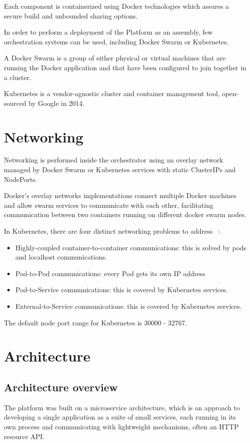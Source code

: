 Each component is containerized using Docker technologies which assures a secure build and unbounded sharing options.

In order to perform a deployment of the Platform as an assembly, few orchestration systems can be used, including Docker Swarm or Kubernetes.

A Docker Swarm is a group of either physical or virtual machines that are running the Docker application and that have been configured to join together in a cluster.

Kubernetes is a vendor-agnostic cluster and container management tool, open-sourced by Google in 2014.

\section{Networking}

Networking is performed inside the orchestrator using an overlay network managed by Docker Swarm or Kubernetes services with static ClusterIPs and NodePorts.

Docker's overlay networks implementations connect multiple Docker machines and allow swarm services to communicate with each other, facilitating communication between two containers running on
different docker swarm nodes.

In Kubernetes, there are four distinct networking problems to address ~\cite{authors2017kubernetes}:

\begin{itemize}
    \item Highly-coupled container-to-container communications: this is solved by pods and localhost communications.
    \item Pod-to-Pod communications: every Pod gets its own IP address
    \item Pod-to-Service communications: this is covered by Kubernetes services.
    \item External-to-Service communications: this is covered by Kubernetes services.
\end{itemize}

The default node port range for Kubernetes is 30000 - 32767.


\section{Architecture}

\subsection{Architecture overview}
The platform was built on a microservice architecture, which is an approach to developing a single application as a suite of small services, each running in its own process and communicating with lightweight mechanisms, often an HTTP resource API.

